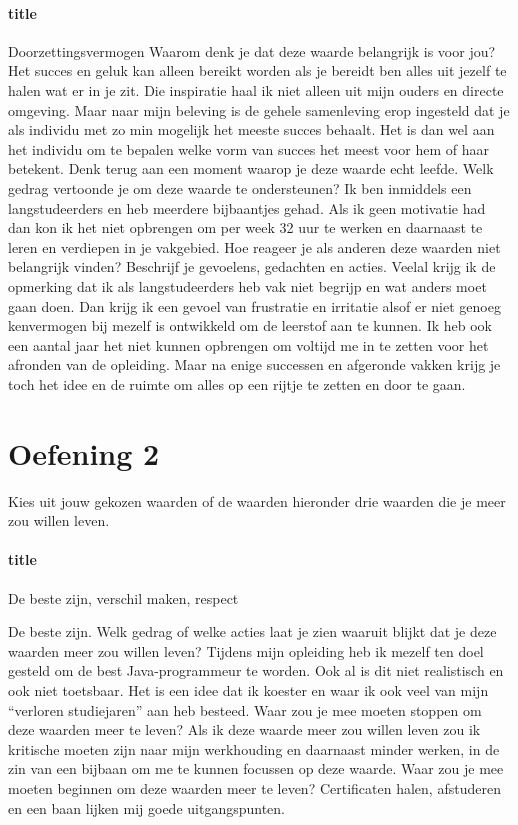 \documentclass[11pt]{report}
\begin{document}
\paragraph{title}
Doorzettingsvermogen
Waarom denk je dat deze waarde belangrijk is voor jou? Het succes en geluk kan alleen bereikt worden als je bereidt ben alles uit jezelf te halen wat er in je zit. Die inspiratie haal ik niet alleen uit mijn ouders en directe omgeving. Maar naar mijn beleving is de gehele samenleving erop ingesteld dat je als individu met zo min mogelijk het meeste succes behaalt. Het is dan wel aan het individu om te bepalen welke vorm van succes het meest voor hem of haar betekent.
Denk terug aan een moment waarop je deze waarde echt leefde. Welk gedrag vertoonde je om deze waarde te ondersteunen? Ik ben inmiddels een langstudeerders en heb meerdere bijbaantjes gehad. Als ik geen motivatie had dan kon ik het niet opbrengen om per week 32 uur te werken en daarnaast te leren en verdiepen in je vakgebied.
Hoe reageer je als anderen deze waarden niet belangrijk vinden? Beschrijf je gevoelens, gedachten en acties. Veelal krijg ik de opmerking dat ik als langstudeerders heb vak niet begrijp en wat anders moet gaan doen. Dan krijg ik een gevoel van frustratie en irritatie alsof er niet genoeg kenvermogen bij mezelf is ontwikkeld om de leerstof aan te kunnen. Ik heb ook een aantal jaar het niet kunnen opbrengen om voltijd me in te zetten voor het afronden van de opleiding. Maar na enige successen en afgeronde vakken krijg je toch het idee en de ruimte om alles op een rijtje te zetten en door te gaan.

\section{Oefening 2}
Kies uit jouw gekozen waarden of de waarden hieronder drie waarden die je meer zou willen leven.
\paragraph{title}
De beste zijn, verschil maken, respect

De beste zijn.
Welk gedrag of welke acties laat je zien waaruit blijkt dat je deze waarden meer zou willen leven?
Tijdens mijn opleiding heb ik mezelf ten doel gesteld om de best Java-programmeur te worden. Ook al is dit niet realistisch en ook niet toetsbaar. Het is een idee dat ik koester en waar ik ook veel van mijn “verloren studiejaren” aan heb besteed.
Waar zou je mee moeten stoppen om deze waarden meer te leven? Als ik deze waarde meer zou willen leven zou ik kritische moeten zijn naar mijn werkhouding en daarnaast minder werken, in de zin van een bijbaan om me te kunnen focussen op deze waarde.
Waar zou je mee moeten beginnen om deze waarden meer te leven? Certificaten halen, afstuderen en een baan lijken mij goede uitgangspunten.
\end{document}
